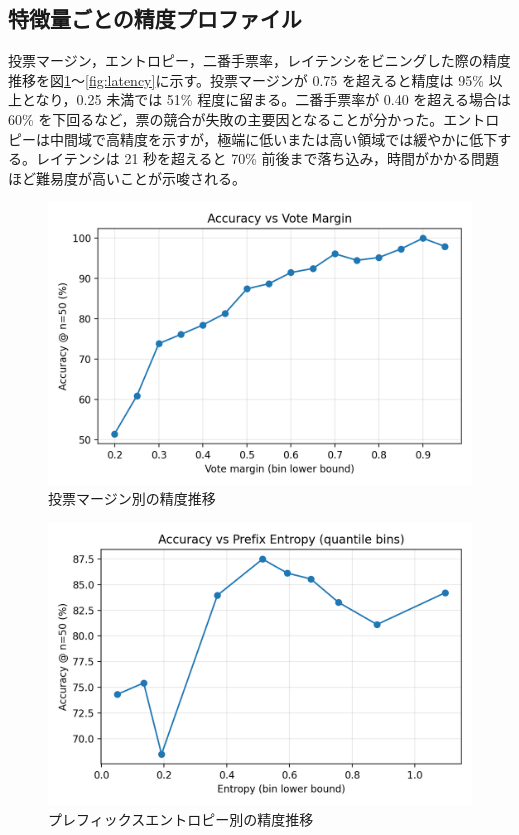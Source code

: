 \documentclass{ipsj}
\begin{document}
\subsection{特徴量ごとの精度プロファイル}
投票マージン，エントロピー，二番手票率，レイテンシをビニングした際の精度推移を図\ref{fig:vote}～\ref{fig:latency}に示す。投票マージンが 0.75 を超えると精度は 95\% 以上となり，0.25 未満では 51\% 程度に留まる。二番手票率が 0.40 を超える場合は 60\% を下回るなど，票の競合が失敗の主要因となることが分かった。エントロピーは中間域で高精度を示すが，極端に低いまたは高い領域では緩やかに低下する。レイテンシは 21 秒を超えると 70\% 前後まで落ち込み，時間がかかる問題ほど難易度が高いことが示唆される。

\begin{figure}[tb]
  \centering
  \includegraphics[width=0.8\linewidth]{../../figures/n50_batch/accuracy_vs_vote_margin.png}
  \caption{投票マージン別の精度推移}
  \label{fig:vote}
\end{figure}

\begin{figure}[tb]
  \centering
  \includegraphics[width=0.8\linewidth]{../../figures/n50_batch/accuracy_vs_entropy.png}
  \caption{プレフィックスエントロピー別の精度推移}
  \label{fig:entropy}
\end{figure}
\end{document}
